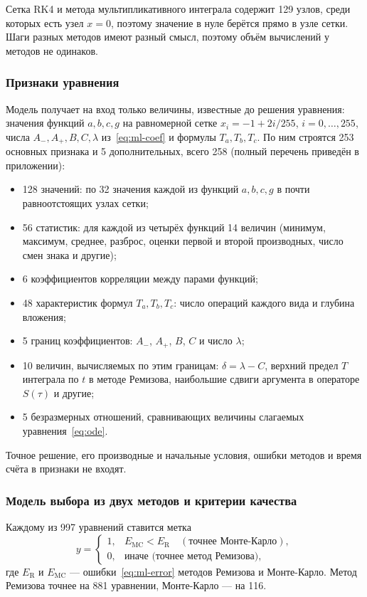 \documentclass[14pt,a4paper]{extarticle}
\begin{document}
Сетка RK4 и метода мультипликативного интеграла содержит 129 узлов,
среди которых есть узел $x=0$, поэтому значение в нуле берётся прямо
в узле сетки. Шаги разных методов имеют разный смысл, поэтому объём
вычислений у методов не одинаков.

\subsubsection{Признаки уравнения}
Модель получает на вход только величины, известные до решения
уравнения: значения функций $a,b,c,g$ на равномерной сетке
$x_i=-1+2i/255$, $i=0,\dots,255$, числа $A_-,A_+,B,C,\lambda$
из~\eqref{eq:ml-coef} и формулы $T_a,T_b,T_c$. По ним строятся
253 основных признака и 5 дополнительных, всего 258
(полный перечень приведён в приложении):
\begin{itemize}
\item 128 значений: по 32 значения каждой из функций $a,b,c,g$
в почти равноотстоящих узлах сетки;
\item 56 статистик: для каждой из четырёх функций 14 величин
(минимум, максимум, среднее, разброс, оценки первой и второй
производных, число смен знака и другие);
\item 6 коэффициентов корреляции между парами функций;
\item 48 характеристик формул $T_a,T_b,T_c$: число операций каждого вида
и глубина вложения;
\item 5 границ коэффициентов: $A_-$, $A_+$, $B$, $C$ и число $\lambda$;
\item 10 величин, вычисляемых по этим границам: $\delta=\lambda-C$,
верхний предел $T$ интеграла по $t$ в методе Ремизова, наибольшие сдвиги
аргумента в операторе $S(\tau)$ и другие;
\item 5 безразмерных отношений, сравнивающих величины слагаемых
уравнения~\eqref{eq:ode}.
\end{itemize}
Точное решение, его производные и начальные условия, ошибки методов
и время счёта в признаки не входят.

\subsubsection{Модель выбора из двух методов и критерии качества}
Каждому из 997 уравнений ставится метка
\[
y=\begin{cases}
1, & E_{\mathrm{MC}}<E_{\mathrm{R}}\quad(\text{точнее Монте-Карло}),\\
0, & \text{иначе (точнее метод Ремизова)},
\end{cases}
\]
где $E_{\mathrm{R}}$ и $E_{\mathrm{MC}}$ --- ошибки~\eqref{eq:ml-error}
методов Ремизова и Монте-Карло. Метод Ремизова точнее на 881 уравнении,
Монте-Карло --- на 116.
\end{document}
